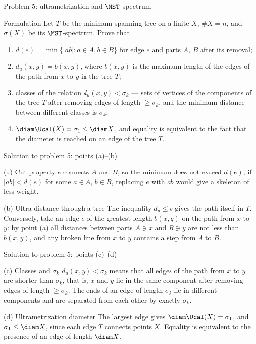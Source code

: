 \documentclass[aspectratio=169,11pt]{beamer}
\begin{document}
\begin{frame}{Problem \textup{5}: ultrametrization and $\MST$-spectrum}
\begin{block}{Formulation}
Let $T$ be the minimum spanning tree on a finite $X$, $\#X = n$, and $\sigma(X)$ be its $\MST$-spectrum. Prove that
\begin{enumerate}
\item[(a)] $d(e) = \min\{|ab| : a \in A, b \in B\}$ for edge $e$ and parts $A$, $B$ after its removal\textup{;}
\item[(b)] $d_u(x,y) = b(x,y)$, where $b(x,y)$ is the maximum length of the edges of the path from $x$ to $y$ in the tree $T$\textup{;}
\item[(c)] classes of the relation $d_u(x,y) < \sigma_k$ --- sets of vertices of the components of the tree $T$ after removing edges of length $\ge \sigma_k$, and the minimum distance between different classes is $\sigma_k$\textup{;}
\item[(d)] $\diam\Ucal(X) = \sigma_1 \le \diam X$, and equality is equivalent to the fact that the diameter is reached on an edge of the tree $T$.
\end{enumerate}
\end{block}
\end{frame}

\begin{frame}{Solution to problem \textup{5}: points \textup{(a)}--\textup{(b)}}
\begin{block}{\textup{(a)} Cut property}
$e$ connects $A$ and $B$, so the minimum does not exceed $d(e)$\textup{;} if $|ab| < d(e)$ for some $a \in A$, $b \in B$, replacing $e$ with $ab$ would give a skeleton of less weight.
\end{block}
\begin{block}{\textup{(b)} Ultra distance through a tree}
The inequality $d_u \le b$ gives the path itself in $T$. Conversely, take an edge $e$ of the greatest length $b(x,y)$ on the path from $x$ to $y$\textup{:} by point \textup{(a)} all distances between parts $A \ni x$ and $B \ni y$ are not less than $b(x,y)$, and any broken line from $x$ to $y$ contains a step from $A$ to $B$.
\end{block}
\end{frame}

\begin{frame}{Solution to problem \textup{5}: points \textup{(c)}--\textup{(d)}}
\begin{block}{\textup{(c)} Classes and $\sigma_k$}
$d_u(x,y) < \sigma_k$ means that all edges of the path from $x$ to $y$ are shorter than $\sigma_k$, that is, $x$ and $y$ lie in the same component after removing edges of length $\ge \sigma_k$. The ends of an edge of length $\sigma_k$ lie in different components and are separated from each other by exactly $\sigma_k$.
\end{block}
\begin{block}{\textup{(d)} Ultrametrization diameter}
The largest edge gives $\diam\Ucal(X) = \sigma_1$, and $\sigma_1 \le \diam X$, since each edge $T$ connects points $X$. Equality is equivalent to the presence of an edge of length $\diam X$.
\end{block}
\end{frame}
\end{document}
